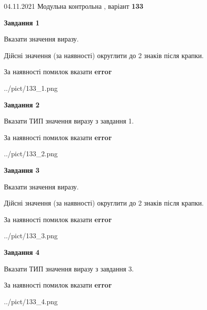 \documentclass[11pt, ukrainian]{article}
\begin{document}
{04.11.2021 Модульна контрольна , варіант  \No \textbf { 133 }\par}
{
\begin {large}
{\begin {center}\textbf{Завдання 1}\end {center}}\par
Вказати значення виразу. \par
Дійсні значення (за наявності) округлити до 2 знаків після крапки. \par
За наявності помилок вказати \textbf{error}

\begin{center}
	{../pict/133_1.png}
\end{center}
\newpage

{\begin {center}\textbf{Завдання 2}\end {center}}\par
Вказати ТИП значення виразу з завдання 1. \par
За наявності помилок вказати \textbf{error}

\begin{center}
	{../pict/133_2.png}
\end{center}
\newpage

{\begin {center}\textbf{Завдання 3}\end {center}}\par
Вказати значення виразу. \par
Дійсні значення (за наявності) округлити до 2 знаків після крапки. \par
За наявності помилок вказати \textbf{error}

\begin{center}
	{../pict/133_3.png}
\end{center}
\newpage

{\begin {center}\textbf{Завдання 4}\end {center}}\par
Вказати ТИП значення виразу з завдання 3. \par
За наявності помилок вказати \textbf{error}

\begin{center}
	{../pict/133_4.png}
\end{center}
\newpage


\end{large}}
\end{document}
